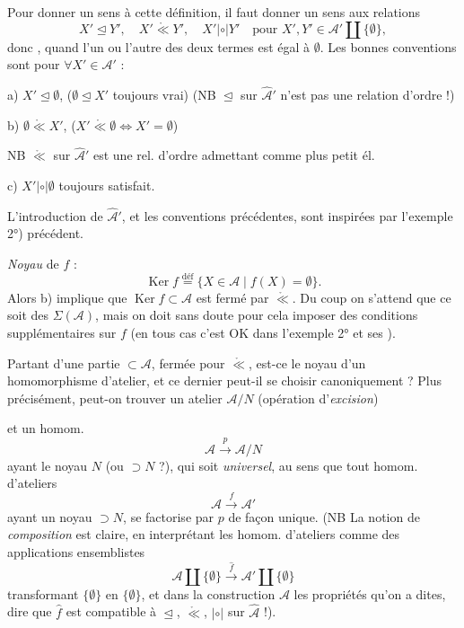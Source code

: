 \documentclass[11pt,a4paper]{article}
\begin{document}

Pour donner un sens à cette définition, il faut donner un sens aux relations
\[
  X' \trianglelefteq Y', \quad X' \mathrel{\mathring{\ll}} Y', \quad X' \mathrel{|{\circ}|} Y'
  \quad \text{pour } X', Y' \in \mathcal{A}' \amalg \{\emptyset\},
\]
donc , quand l'un ou l'autre des deux termes est \struck{\ill{}} égal à $\emptyset$. Les bonnes conventions sont pour $\forall X' \in \mathcal{A}'$ :

a) $X' \trianglelefteq \emptyset$, \struck{\ill{}} ($\emptyset \trianglelefteq X'$ \struck{\ill{}} toujours vrai) (NB $\trianglelefteq$ sur $\hat{\mathcal{A}}'$ \struck{\ill{}} n'est pas une relation d'ordre !)

b) $\emptyset \mathrel{\mathring{\ll}} X'$, ($X' \mathrel{\mathring{\ll}} \emptyset \iff X' = \emptyset$)

NB $\mathring{\ll}$ sur $\hat{\mathcal{A}}'$ est une rel. d'ordre admettant \uncertain{$\emptyset$} comme plus petit él.

c) $X' \mathrel{|{\circ}|} \emptyset$ toujours satisfait.

L'introduction de $\hat{\mathcal{A}}'$, et les conventions précédentes, sont inspirées par l'exemple 2°) précédent.

\textit{Noyau} de $f$ :
\[
  \operatorname{Ker} f \overset{\text{déf}}{=} \{ X \in \mathcal{A} \mid f(X) = \emptyset \}.
\]
Alors b) implique que $\operatorname{Ker} f \subset \mathcal{A}$ est fermé par $\mathring{\ll}$. Du coup on s'attend que ce soit des $\Sigma(\mathcal{A})$, mais on doit sans doute pour cela imposer des conditions supplémentaires sur $f$ (en tous cas c'est OK dans l'exemple 2° et ses ).

Partant d'une partie  $\subset \mathcal{A}$, fermée pour $\mathring{\ll}$, est-ce le noyau d'un homomorphisme d'atelier, et ce dernier peut-il se choisir canoniquement ? Plus précisément, peut-on trouver un atelier $\mathcal{A}/N$ (opération d'\emph{excision})

et un homom.
\[
  \mathcal{A} \xrightarrow{\;p\;} \mathcal{A}/N
\]
ayant le noyau $N$ (ou $\supset N$ ?), qui soit \emph{universel}, au sens que tout homom. d'ateliers
\[
  \mathcal{A} \xrightarrow{\;f\;} \mathcal{A}'
\]
ayant un noyau $\supset N$, se factorise par $p$ de façon unique. (NB La notion de \emph{composition} est claire, en interprétant les homom. d'ateliers comme des applications ensemblistes
\[
  \mathcal{A} \amalg \{\emptyset\} \xrightarrow{\;\hat{f}\;} \mathcal{A}' \amalg \{\emptyset\}
\]
transformant $\{\emptyset\}$ en $\{\emptyset\}$, et   dans la construction \ill{} $\mathcal{A}$ \ill{} les propriétés qu'on a dites,  dire que $\hat{f}$ est compatible à $\trianglelefteq$, $\mathring{\ll}$, $|{\circ}|$ sur $\hat{\mathcal{A}}$ !).
\end{document}
